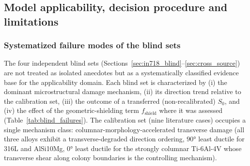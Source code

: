 \subsection{Model applicability, decision procedure and limitations}

\subsubsection{Systematized failure modes of the blind sets}
\label{sec:applicability}

The four independent blind sets (Sections~\ref{sec:in718_blind}--\ref{sec:cross_source}) are not treated as isolated anecdotes but as a systematically classified evidence base for the applicability domain. Each blind set is characterized by (i) the dominant microstructural damage mechanism, (ii) its direction trend relative to the calibration set, (iii) the outcome of a transferred (non-recalibrated) $S_0$, and (iv) the effect of the geometric-shielding term $f_{\text{shield}}$ where it was assessed (Table~\ref{tab:blind_failures}). The calibration set (nine literature cases) occupies a single mechanism class: columnar-morphology-accelerated transverse damage (all three alloys exhibit a transverse-degraded direction ordering, $\ang{90}$ least ductile for 316L and AlSi10Mg, $\ang{0}$ least ductile for the strongly columnar Ti-6Al-4V whose transverse shear along colony boundaries is the controlling mechanism).

